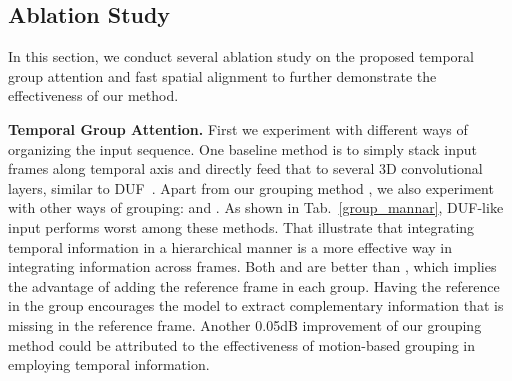 \subsection{Ablation Study}
In this section, we conduct several ablation study on the proposed temporal group attention and fast spatial alignment to further demonstrate the effectiveness of our method.

\textbf{Temporal Group Attention.} First we experiment with different ways of organizing the input sequence. 
One baseline method is to simply stack input frames along temporal axis and directly feed that to several 3D convolutional layers, similar to DUF~\cite{jo2018deep}. Apart from our grouping method , we also experiment with other ways of grouping:  and . As shown in Tab.~\ref{group_mannar}, DUF-like input performs worst among these methods. That illustrate that integrating temporal information in a hierarchical manner is a more effective way in integrating information across frames. Both  and  are better than , which implies the advantage of adding the reference frame in each group. Having the reference in the group encourages the model to extract complementary information that is missing in the reference frame. Another 0.05dB improvement of our grouping method  could be attributed to the effectiveness of motion-based grouping in employing temporal information.
\begin{table}[t]
	
	\centering
\vspace{1mm}
	\caption{Ablation on: different grouping strategies.}
	\vspace{-5mm}
	\label{group_mannar}
\end{table}

